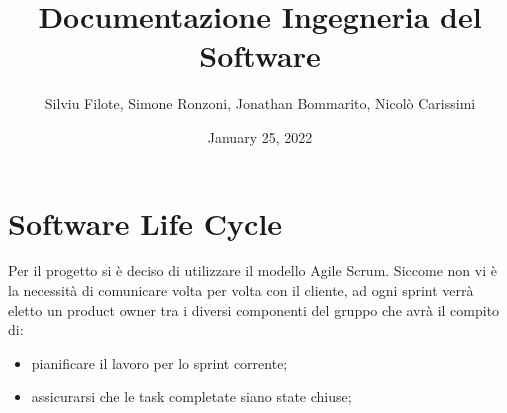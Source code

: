 \documentclass[12pt]{article}
\begin{document}
\title{Documentazione Ingegneria del Software}
\author{Silviu Filote, Simone Ronzoni, Jonathan Bommarito, Nicolò Carissimi}
\date{January 25, 2022}
\maketitle %


\tableofcontents
\newpage
\raggedright

\section{Software Life Cycle}
Per il progetto si è deciso di utilizzare il modello Agile Scrum. Siccome non vi è la necessità di comunicare volta per volta con il cliente, ad ogni sprint verrà eletto un product owner tra i diversi componenti del gruppo che avrà il compito di:
\begin{itemize}
  \item pianificare il lavoro per lo sprint corrente;
  \item assicurarsi che le task completate siano state chiuse;
\end{itemize}
\end{document}
